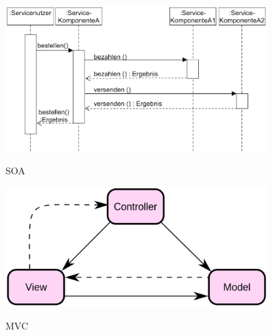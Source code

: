 \begin{figure}[htb]
	\centering
	\begin{minipage}[t]{0.45\linewidth}
		\centering
		\includegraphics[width=0.9\textwidth]{images/soa}
		\label{fig:soa}
		\caption{SOA}
	\end{minipage}%
	\hfill
	\begin{minipage}[t]{0.45\linewidth}
		\centering
		\includegraphics[width=0.9\textwidth]{images/mvc}
		\label{fig:mvc}
		\caption{MVC}
	\end{minipage}
\end{figure}

